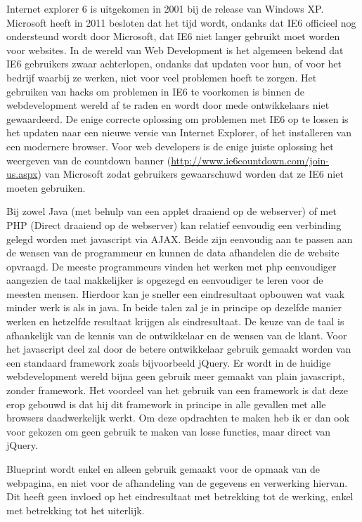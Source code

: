 
Internet explorer 6 is uitgekomen in 2001 bij de release van Windows XP\cite{bib.wikipedia.ie6}. Microsoft heeft in 2011 besloten dat het tijd wordt, ondanks dat IE6 officieel nog ondersteund wordt door Microsoft, dat IE6 niet langer gebruikt moet worden voor websites. In de wereld van Web Development is het algemeen bekend dat IE6 gebruikers zwaar achterlopen, ondanks dat updaten voor hun, of voor het bedrijf waarbij ze werken, niet voor veel problemen hoeft te zorgen. Het gebruiken van hacks om problemen in IE6 te voorkomen is binnen de webdevelopment wereld af te raden en wordt door mede ontwikkelaars niet gewaardeerd. De enige correcte oplossing om problemen met IE6 op te lossen is het updaten naar een nieuwe versie van Internet Explorer, of het installeren van een modernere browser. Voor web developers is de enige juiste oplossing het weergeven van de countdown banner (\url{http://www.ie6countdown.com/join-us.aspx}) van Microsoft zodat gebruikers gewaarschuwd worden dat ze IE6 niet moeten gebruiken. 

Bij zowel Java (met behulp van een applet draaiend op de webserver) of met PHP (Direct draaiend op de webserver) kan relatief eenvoudig een verbinding gelegd worden met javascript via AJAX. Beide zijn eenvoudig aan te passen aan de wensen van de programmeur en kunnen de data afhandelen die de website opvraagd.
De meeste programmeurs vinden het werken met php eenvoudiger aangezien de taal makkelijker is opgezegd en eenvoudiger te leren voor de meesten mensen. Hierdoor kan je sneller een eindresultaat opbouwen wat vaak minder werk is als in java. 
In beide talen zal je in principe op dezelfde manier werken en hetzelfde resultaat krijgen als eindresultaat. De keuze van de taal is afhankelijk van de kennis van de ontwikkelaar en de wensen van de klant.
Voor het javascript deel zal door de betere ontwikkelaar gebruik gemaakt worden van een standaard framework zoals bijvoorbeeld jQuery. Er wordt in de huidige webdevelopment wereld bijna geen gebruik meer gemaakt van plain javascript, zonder framework. Het voordeel van het gebruik van een framework is dat deze erop gebouwd is dat hij dit framework in principe in alle gevallen met alle browsers daadwerkelijk werkt. Om deze opdrachten te maken heb ik er dan ook voor gekozen om geen gebruik te maken van losse functies, maar direct van jQuery.

Blueprint wordt enkel en alleen gebruik gemaakt voor de opmaak van de webpagina, en niet voor de afhandeling van de gegevens en verwerking hiervan. Dit heeft geen invloed op het eindresultaat met betrekking tot de werking, enkel met betrekking tot het uiterlijk.

